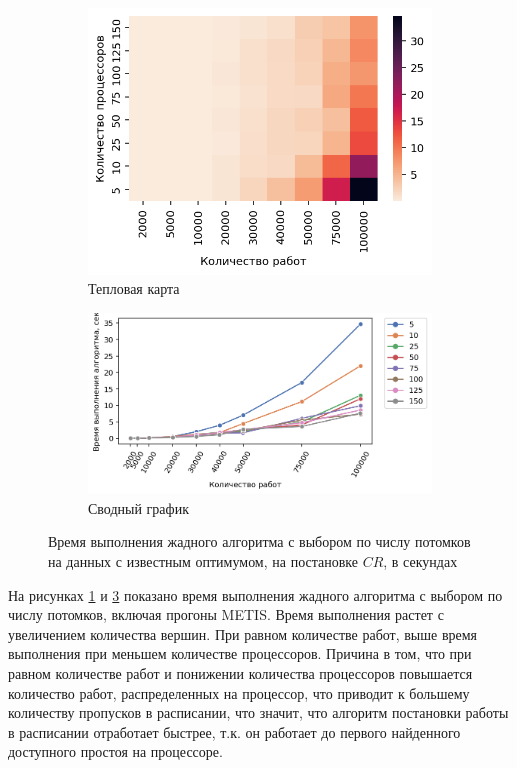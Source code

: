 \begin{figure}[!htbp]
    \centering
    \begin{subfigure}{0.49\textwidth}
        \includegraphics[width=\textwidth]{imgs/ideal_1/CR/et_heatmap.png}
        \caption{Тепловая карта}
        \label{fig:CR-exec-time-heatmap}
    \end{subfigure}
    \hfill
    \begin{subfigure}{0.49\textwidth}
        \includegraphics[width=\textwidth]{imgs/ideal_1/CR/tr_graph.png}
        \caption{Сводный график}
        \label{fig:CR-exec-time-compiled}
    \end{subfigure}
    \caption{Время выполнения жадного алгоритма с выбором по числу потомков на данных с известным оптимумом, на постановке $CR$, в секундах}
\end{figure}

На рисунках \ref{fig:CR-exec-time-heatmap} и \ref{fig:CR-exec-time-compiled} показано время выполнения жадного алгоритма с выбором по числу потомков, включая прогоны METIS. Время выполнения растет с увеличением количества вершин. При равном количестве работ, выше время выполнения при меньшем количестве процессоров. Причина в том, что при равном количестве работ и понижении количества процессоров повышается количество работ, распределенных на процессор, что приводит к большему количеству пропусков в расписании, что значит, что алгоритм постановки работы в расписании отработает быстрее, т.к. он работает до первого найденного доступного простоя на процессоре. 

